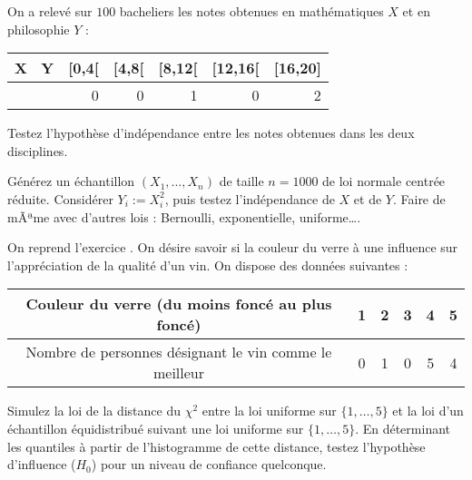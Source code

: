 \begin{exo}
  On a relevé sur $100$ bacheliers les notes obtenues en mathématiques $X$ et
  en philosophie $Y$ :
 \begin{center}
 \begin{tabular}{|l||r|r|r|r|r|} \hline
  X \ Y & [0,4[ & [4,8[ & [8,12[ & [12,16[ & [16,20] \\ \hline\hline
  [0,4[&3&4&2&0&0\\ \hline
  [4,8[&6&10&8&2&0\\ \hline
  [8,12[&1&8&20&12&3\\ \hline
  [12,16[&0&0&8&7&3\\ \hline
  [16,20]&0&0&1&0&2\\ \hline
 \end{tabular} 
 \end{center}
 Testez l'hypothèse d'indépendance entre les notes obtenues dans les deux
 disciplines.
\end{exo}

\begin{exo}
  Générez un échantillon $(X_1,\ldots,X_n)$ de taille $n=1000$ de loi normale
  centrée réduite. Considérer $Y_i:=X_i^2$, puis testez l'indépendance de $X$
  et de $Y$. Faire de mÃªme avec d'autres lois : Bernoulli, exponentielle,
  uniforme\ldots.
\end{exo}

\begin{exo}
  On reprend l'exercice \cite[page 97]{tomassone}. On désire
  savoir si la couleur du verre à une influence sur l'appréciation de la
  qualité d'un vin. On dispose des données suivantes :
 \begin{center}
 \begin{tabular}{|c|c|c|c|c|c|}
  \hline Couleur du verre (du moins foncé au plus foncé)&1&2&3&4&5  \\
  \hline Nombre de personnes désignant le vin comme le meilleur & 0&1&0&5&4 \\
  \hline
 \end{tabular}
 \end{center}
 Simulez la loi de la distance du $\chi^2$ entre la loi uniforme sur
 $\{1,\ldots,5\}$ et la loi d'un échantillon équidistribué suivant une loi
 uniforme sur $\{1,\ldots,5\}$. En déterminant les quantiles à partir de
 l'histogramme de cette distance, testez l'hypothèse d'influence ($H_0$) pour
 un niveau de confiance quelconque.
\end{exo}

